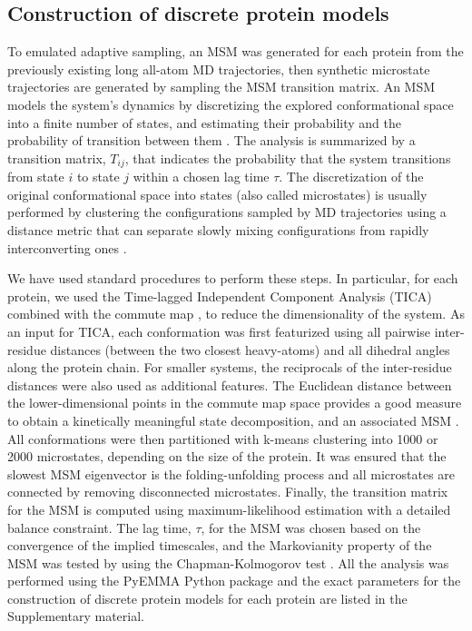 \subsection{\label{sec:methods-msm}Construction of discrete protein models}

To emulated adaptive sampling, an MSM was generated for each protein from
the previously existing long all-atom MD trajectories, then synthetic
microstate trajectories are generated by sampling the MSM transition matrix.
An MSM models the system's dynamics by discretizing the explored
conformational space into a finite number of states, and estimating their
probability and the probability of transition between them \cite{prinz2011markov}.
The analysis is summarized by a transition matrix,
$T_{ij}$, that indicates the probability that the system transitions from state
$i$ to state $j$ within a chosen lag time $\tau$. The discretization of the
original conformational space into states (also called microstates) is usually
performed by clustering the configurations sampled by MD trajectories using
a distance metric that can separate slowly mixing configurations from rapidly
interconverting ones \cite{noe2016commute, Noe2015}.

We have used standard procedures to perform these steps. In particular, for
each protein, we used the Time-lagged Independent Component Analysis (TICA) 
\cite{TICA1-perez2013, TICA2-schwantes2013} combined with the commute map 
\cite{noe2016commute}, to reduce the dimensionality of the system. As an input
for TICA, each conformation was first featurized using all pairwise
inter-residue distances (between the two closest heavy-atoms) and all dihedral
angles along the protein chain.
For smaller systems, the reciprocals of the inter-residue distances were also
used as additional features. The Euclidean distance between the
lower-dimensional points in the commute map space provides a good measure to
obtain a kinetically meaningful state decomposition, and an associated MSM
\cite{noe2016commute}. All conformations were then
partitioned with k-means clustering into 1000 or 2000 microstates, depending on
the size of the protein. It was ensured that the slowest MSM eigenvector is the
folding-unfolding process and all microstates are connected by removing
disconnected microstates. Finally, the transition matrix for the MSM is
computed using maximum-likelihood estimation with a detailed balance
constraint. The lag time, $\tau$, for the MSM was chosen based on the
convergence of the implied timescales, and the Markovianity property of the MSM
was tested by using the Chapman-Kolmogorov test \cite{prinz2011markov}. All the
analysis was performed using the PyEMMA Python package \cite{scherer2015pyemma}
and the exact parameters for the construction of discrete protein models for
each protein are listed in the Supplementary material.


